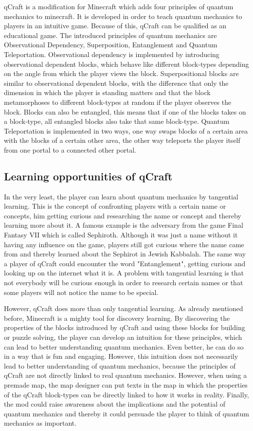 \documentclass[12pt]{report} %
\begin{document}
qCraft is a modification for Minecraft which adds four principles of quantum mechanics to minecraft. It is developed in order to teach quantum mechanics to players in an intuitive game. Because of this, qCraft can be qualified as an educational game. The introduced principles of quantum mechanics are Observational Dependency, Superposition, Entanglement and Quantum Teleportation. Observational dependency is implemented by introducing observational dependent blocks, which behave like different block-types depending on the angle from which the player views the block. Superpositional blocks are similar to observational dependent blocks, with the difference that only the dimension in which the player is standing matters and that the block metamorphoses to different block-types at random if the player observes the block. Blocks can also be entangled, this means that if one of the blocks takes on a block-type, all entangled blocks also take that same block-type. Quantum Teleportation is implemented in two ways, one way swaps blocks of a certain area with the blocks of a certain other area, the other way teleports the player itself from one portal to a connected other portal.

\subsection{Learning opportunities of qCraft}

In the very least, the player can learn about quantum mechanics by tangential learning. This is the concept of confronting players with a certain name or concepts, him getting curious and researching the name or concept and thereby learning more about it. A famous example is the adversary from the game Final Fantasy VII which is called Sephiroth. Although it was just a name without it having any influence on the game, players still got curious where the name came from and thereby learned about the Sephirot in Jewish Kabbalah. The same way a player of qCraft could encounter the word "Entanglement", getting curious and looking up on the internet what it is. A problem with tangential learning is that not everybody will be curious enough in order to research certain names or that some players will not notice the name to be special.

However, qCraft does more than only tangential learning. As already mentioned before, Minecraft is a mighty tool for discovery learning. By discovering the properties of the blocks introduced by qCraft and using these blocks for building or puzzle solving, the player can develop an intuition for these principles, which can lead to better understanding quantum mechanics. Even better, he can do so in a way that is fun and engaging. However, this intuition does not necessarily lead to better understanding of quantum mechanics, because the principles of qCraft are not directly linked to real quantum mechanics. However, when using a premade map, the map designer can put texts in the map in which the properties of the qCraft block-types can be directly linked to how it works in reality. Finally, the mod could raise awareness about the implications and the potential of quantum mechanics and thereby it could persuade the player to think of quantum mechanics as important.
\end{document}
